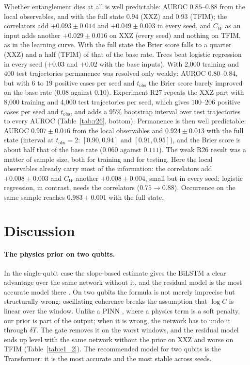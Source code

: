 \documentclass[twocolumn,10pt]{article}
\begin{document}
Whether entanglement dies at all is well predictable: AUROC $0.85$--$0.88$
from the local observables, and with the full state $0.94$ (XXZ) and
$0.93$ (TFIM); the correlators add $+0.093 \pm 0.014$ and
$+0.049 \pm 0.003$ in every seed, and $C_W$ as an input adds another
$+0.029 \pm 0.016$ on XXZ (every seed) and nothing on TFIM, as in the
learning curve. With the full state the Brier score falls to a quarter
(XXZ) and a half (TFIM) of that of the base rate. Trees beat logistic
regression in every seed ($+0.03$ and $+0.02$ with the base inputs).
With 2{,}000 training and 400 test trajectories permanence was resolved
only weakly: AUROC $0.80$--$0.84$, but with $6$ to $19$ positive cases per
seed and $t_\mathrm{obs}$ the Brier score barely improved on the base
rate ($0.08$ against $0.10$). Experiment R27 repeats the XXZ part with
8{,}000 training and 4{,}000 test trajectories per seed, which gives
$100$--$206$ positive cases per seed and $t_\mathrm{obs}$, and adds a 95\%
bootstrap interval over test trajectories to every AUROC
(Table~\ref{tab:r26}, bottom). Permanence is then well predictable:
AUROC $0.907 \pm 0.016$ from the local observables and
$0.924 \pm 0.013$ with the full state (interval at $t_\mathrm{obs} = 2$:
$[0.90, 0.94]$ and $[0.91, 0.95]$), and the Brier score is about half
that of the base rate ($0.060$ against $0.111$). The weak R26 result was
a matter of sample size, both for training and for testing. Here the
local observables already carry most of the information: the
correlators add $+0.008 \pm 0.003$ and $C_W$ another
$+0.008 \pm 0.004$, small but in every seed; logistic regression, in
contrast, needs the correlators ($0.75 \to 0.88$). Occurrence on the same
sample reaches $0.983 \pm 0.001$ with the full state.

\section{Discussion}
\label{sec:discussion}

\paragraph{The physics prior on two qubits.}
In the single-qubit case the slope-based estimate gives the BiLSTM a
clear advantage over the same network without it, and the residual model
is the most accurate model there \cite{Paper1Brusnikin}.
On two qubits the formula is not merely imprecise but structurally
wrong: oscillating coherence breaks the assumption that $\log C$ is
linear over the window.
Unlike a PINN \cite{Raissi2019}, where a physics term is a soft penalty,
our prior is part of the output; when it is wrong, the network has to
undo it through $\delta T$.
The gate removes it on the worst windows, and the residual model ends up
level with the same network without the prior on XXZ and worse on TFIM
(Table~\ref{tab:e1_2}).
The recommended model for two qubits is the Transformer: it is the most
accurate and the most stable across seeds.
\end{document}
